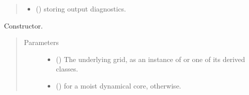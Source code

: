 \documentclass[letterpaper,10pt,english]{sphinxmanual}
\begin{document}
\begin{fulllineitems}
\begin{fulllineitems}
\begin{quote}
\begin{description}
\begin{itemize}
\item {} 
 () \textendash{} {\hyperref[\detokenize{api:tasmania.storages.grid_data.GridData}]{}} storing output diagnostics.

\end{itemize}


\end{description}\end{quote}

\end{fulllineitems}


\begin{fulllineitems}
\label{\detokenize{api:tasmania.dycore.dycore.DynamicalCore.__init__}}
Constructor.
\begin{quote}\begin{description}
\item[{Parameters}] \leavevmode\begin{itemize}
\item {} 
 () \textendash{} The underlying grid, as an instance of {\hyperref[\detokenize{api:tasmania.grids.grid_xyz.GridXYZ}]{}} or one of its derived classes.

\item {} 
 () \textendash{}  for a moist dynamical core,  otherwise.

\end{itemize}

\end{description}\end{quote}

\end{fulllineitems}



\end{fulllineitems}
\end{document}
